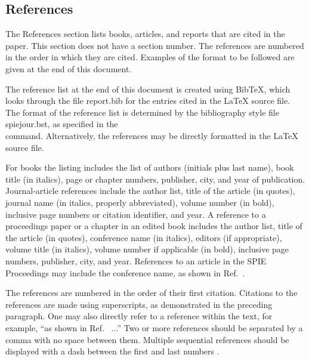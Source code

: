 \documentclass[12pt]{spieman}  %
\begin{document}
\begin{spacing}{2}
\subsection{References}
The References section lists books, articles, and reports that are cited in the paper. This section does not have a section number. The references are numbered in the order in which they are cited. Examples of the format to be followed are given at the end of this document.

The reference list at the end of this document is created using BibTeX, which looks through the file {\ttfamily report.bib} for the entries cited in the LaTeX source file.  The format of the reference list is determined by the bibliography style file {\ttfamily spiejour.bst}, as specified in the \\ \verb|| command.  Alternatively, the references may be directly formatted in the LaTeX source file.

For books the listing includes the list of authors (initials plus last name), book title (in italics), page or chapter numbers, publisher, city, and year of publication.  Journal-article references  include the author list, title of the article (in quotes), journal name (in italics, properly abbreviated), volume number (in bold), inclusive page numbers or citation identifier, and year.  A reference to a proceedings paper or a chapter in an edited book includes the author list, title of the article (in quotes), conference name (in italics), editors (if appropriate), volume title (in italics), volume number if applicable (in bold), inclusive page numbers, publisher, city, and year.  References to an article in the SPIE Proceedings may include the conference name, as shown in Ref.~.

The references are numbered in the order of their first citation. Citations to the references are made using superscripts, as demonstrated in the preceding paragraph. One may also directly refer to a reference within the text, for example, ``as shown in Ref.~ ...''  Two or more references should be separated by a comma with no space between them. Multiple sequential references should be displayed with a dash between the first and last numbers .


\end{spacing}
\end{document}
